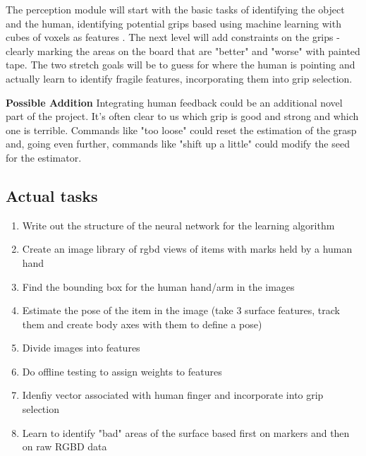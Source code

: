 \documentclass[10pt]{article}
\begin{document}
The perception module will start with the basic tasks of identifying the object and the human, identifying potential grips based using machine learning with cubes of voxels as features . The next level will add constraints on the grips - clearly marking the areas on the board that are "better" and "worse" with painted tape. The two stretch goals will be to guess for where the human is pointing and actually learn to identify fragile features, incorporating them into grip selection.
 
 \textbf{Possible Addition} Integrating human feedback could be an additional novel part of the project. It's often clear to us which grip is good and strong and which one is terrible. Commands like "too loose" could reset the estimation of the grasp and, going even further, commands like "shift up a little" could modify the seed for the estimator.
 
 \subsection{Actual tasks}
 \begin{enumerate}
 \item Write out the structure of the neural network for the learning algorithm
 \item Create an image library of rgbd views of items with marks held by a human hand
 \item Find the bounding box for the human hand/arm in the images
 \item Estimate the pose of the item in the image (take 3 surface features, track them and create body axes with them to define a pose)
 \item Divide images into features 
 \item Do offline testing to assign weights to features
 \item Idenfiy vector associated with human finger and incorporate into grip selection
 \item Learn to identify "bad" areas of the surface based first on markers and then on raw RGBD data

\end{enumerate} 
\nocite{*} 
 


 
\end{document}
